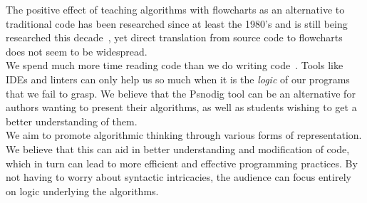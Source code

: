 The positive effect of teaching algorithms with flowcharts as an alternative to traditional code has been researched since at least the 1980's and is still being researched this decade~\cite{DBLP:journals/software/Scanlan89, 7096016, flowchartsHighschool}, yet direct translation from source code to flowcharts does not seem to be widespread. \hfill \\

We spend much more time reading code than we do writing code~\cite[14]{martin2008clean}. Tools like IDEs and linters can only help us so much when it is the \textit{logic} of our programs that we fail to grasp. We believe that the Psnodig tool can be an alternative for authors wanting to present their algorithms, as well as students wishing to get a better understanding of them. \hfill \\

We aim to promote algorithmic thinking through various forms of representation. We believe that this can aid in better understanding and modification of code, which in turn can lead to more efficient and effective programming practices. By not having to worry about syntactic intricacies, the audience can focus entirely on logic underlying the algorithms.







